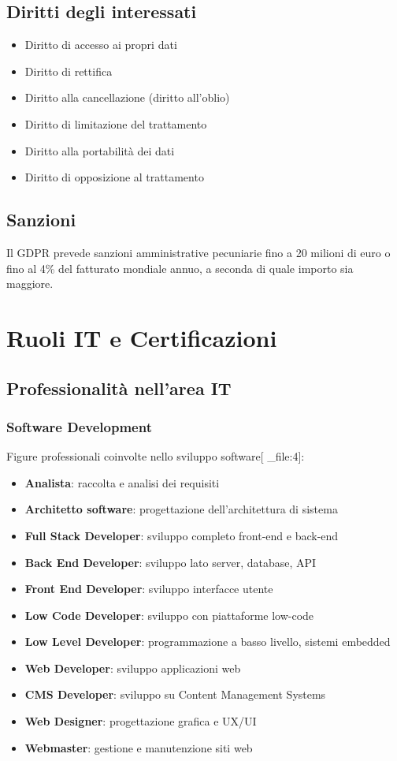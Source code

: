 \documentclass[12pt,a4paper]{article}
\begin{document}
\subsection{Diritti degli interessati}
\begin{itemize}
    \item Diritto di accesso ai propri dati
    \item Diritto di rettifica
    \item Diritto alla cancellazione (diritto all'oblio)
    \item Diritto di limitazione del trattamento
    \item Diritto alla portabilità dei dati
    \item Diritto di opposizione al trattamento
\end{itemize}

\subsection{Sanzioni}
Il GDPR prevede sanzioni amministrative pecuniarie fino a 20 milioni di euro o fino al 4\% del fatturato mondiale annuo, a seconda di quale importo sia maggiore.

\section{Ruoli IT e Certificazioni}

\subsection{Professionalità nell'area IT}

\subsubsection{Software Development}
Figure professionali coinvolte nello sviluppo software[ _file:4]:
\begin{itemize}
    \item \textbf{Analista}: raccolta e analisi dei requisiti
    \item \textbf{Architetto software}: progettazione dell'architettura di sistema
    \item \textbf{Full Stack Developer}: sviluppo completo front-end e back-end
    \item \textbf{Back End Developer}: sviluppo lato server, database, API
    \item \textbf{Front End Developer}: sviluppo interfacce utente
    \item \textbf{Low Code Developer}: sviluppo con piattaforme low-code
    \item \textbf{Low Level Developer}: programmazione a basso livello, sistemi embedded
    \item \textbf{Web Developer}: sviluppo applicazioni web
    \item \textbf{CMS Developer}: sviluppo su Content Management Systems
    \item \textbf{Web Designer}: progettazione grafica e UX/UI
    \item \textbf{Webmaster}: gestione e manutenzione siti web
\end{itemize}
\end{document}
